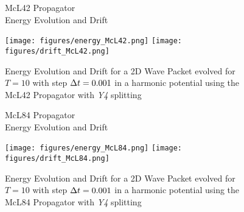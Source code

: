 \begin{figure}[ht]
	\begin{minipage}[c]{\textwidth}
		\begin{center}
			\large McL42 Propagator \\[1mm]
			\normalsize Energy Evolution and Drift
			\vspace{4mm}
		\end{center}
	\end{minipage}
	\texttt{[image: figures/energy\_McL42.png]}
	\texttt{[image: figures/drift\_McL42.png]}
	\caption{Energy Evolution and Drift for a 2D Wave Packet evolved for $T = 10$ with step $\Delta t = 0.001$ in a harmonic potential using the McL42 Propagator with \emph{Y4} splitting}
	\label{fig:energy_McL42}
\end{figure}

\begin{figure}[ht]
	\begin{minipage}[c]{\textwidth}
		\begin{center}
			\large McL84 Propagator \\[1mm]
			\normalsize Energy Evolution and Drift
			\vspace{4mm}
		\end{center}
	\end{minipage}
	\texttt{[image: figures/energy\_McL84.png]}
	\texttt{[image: figures/drift\_McL84.png]}
	\caption{Energy Evolution and Drift for a 2D Wave Packet evolved for $T = 10$ with step $\Delta t = 0.001$ in a harmonic potential using the McL84 Propagator with \emph{Y4} splitting}
	\label{fig:energy_McL84}
\end{figure}
